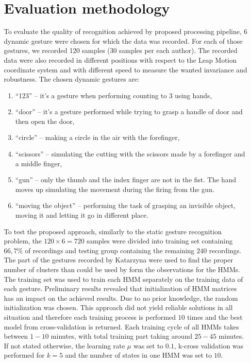\section{Evaluation methodology}

To evaluate the quality of recognition achieved by proposed processing pipeline, $6$ dynamic gesture were chosen for which the data was recorded.
For each of those gestures, we recorded 120 samples (30 samples per each author).
The recorded data were also recorded in different positions with respect to the Leap Motion coordinate system and with different speed to measure the wanted invariance and robustness.
The chosen dynamic gestures are:
\begin{enumerate}
\item ``123'' -- it's a gesture when performing counting to 3 using hands,
\item ``door'' -- it's a gesture performed while trying to grasp a handle of door and then open the door,
\item ``circle'' -- making a circle in the air with the forefinger,
\item ``scissors'' -- simulating the cutting with the scissors made by a forefinger and a middle finger,
\item ``gun'' -- only the thumb and the index finger are not in the fist. The hand moves up simulating the movement during the firing from the gun.
\item ``moving the object'' -- performing the task of grasping an invisible object, moving it and letting it go in different place.
\end{enumerate}

To test the proposed approach, similarly to the static gesture recognition problem, the $120\times6=720$ samples were divided into training set containing $66,7\%$ of recordings and testing group containing the remaining $240$ recordings. 
The part of the gestures recorded by Katarzyna were used to find the proper number of clusters than could be used by form the observations for the HMMs. 
The training set was used to train each HMM separately on the training data of each gesture.
Preliminary results revealed that initialization of HMM matrices has an impact on the achieved results.
Due to no prior knowledge, the random initialization was chosen.
This approach did not yield reliable solutions in all situation and therefore each training process is performed $10$ times and the best model from cross-validation is returned.  
Each training cycle of all HMMs takes between $1-10$ minutes, with total training part taking around $25-45$ minutes.
If not stated otherwise, the learning rate $\mu$ was set to $0.1$, k-cross validation was performed for $k=5$ and the number of states in one HMM was set to $10$.


